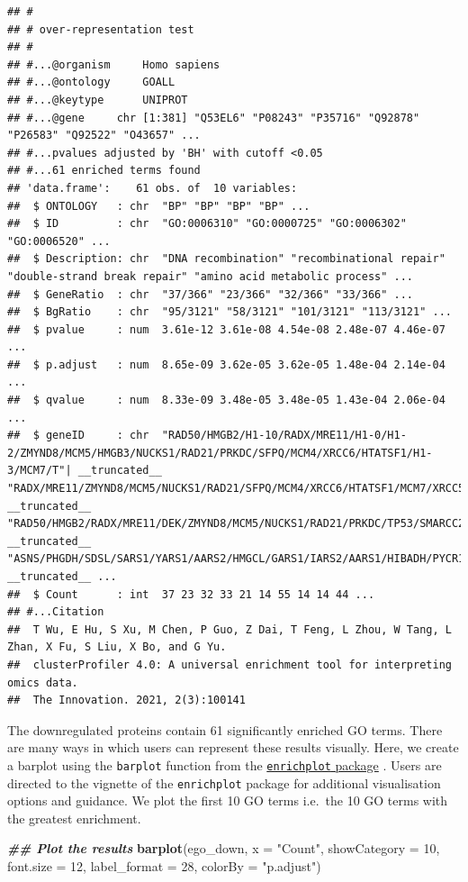 \documentclass[9pt,a4paper,]{extarticle}
\newenvironment{Shaded}{\begin{snugshade}}{\end{snugshade}}
\newcommand{\AttributeTok}[1]{\textcolor[rgb]{0.13,0.29,0.53}{#1}}
\newcommand{\DecValTok}[1]{\textcolor[rgb]{0.00,0.00,0.81}{#1}}
\newcommand{\DocumentationTok}[1]{\textcolor[rgb]{0.56,0.35,0.01}{\textbf{\textit{#1}}}}
\newcommand{\FunctionTok}[1]{\textcolor[rgb]{0.13,0.29,0.53}{\textbf{#1}}}
\newcommand{\NormalTok}[1]{#1}
\newcommand{\StringTok}[1]{\textcolor[rgb]{0.31,0.60,0.02}{#1}}
\begin{document}
\begin{verbatim}
## #
## # over-representation test
## #
## #...@organism     Homo sapiens 
## #...@ontology     GOALL 
## #...@keytype      UNIPROT 
## #...@gene     chr [1:381] "Q53EL6" "P08243" "P35716" "Q92878" "P26583" "Q92522" "O43657" ...
## #...pvalues adjusted by 'BH' with cutoff <0.05 
## #...61 enriched terms found
## 'data.frame':    61 obs. of  10 variables:
##  $ ONTOLOGY   : chr  "BP" "BP" "BP" "BP" ...
##  $ ID         : chr  "GO:0006310" "GO:0000725" "GO:0006302" "GO:0006520" ...
##  $ Description: chr  "DNA recombination" "recombinational repair" "double-strand break repair" "amino acid metabolic process" ...
##  $ GeneRatio  : chr  "37/366" "23/366" "32/366" "33/366" ...
##  $ BgRatio    : chr  "95/3121" "58/3121" "101/3121" "113/3121" ...
##  $ pvalue     : num  3.61e-12 3.61e-08 4.54e-08 2.48e-07 4.46e-07 ...
##  $ p.adjust   : num  8.65e-09 3.62e-05 3.62e-05 1.48e-04 2.14e-04 ...
##  $ qvalue     : num  8.33e-09 3.48e-05 3.48e-05 1.43e-04 2.06e-04 ...
##  $ geneID     : chr  "RAD50/HMGB2/H1-10/RADX/MRE11/H1-0/H1-2/ZMYND8/MCM5/HMGB3/NUCKS1/RAD21/PRKDC/SFPQ/MCM4/XRCC6/HTATSF1/H1-3/MCM7/T"| __truncated__ "RADX/MRE11/ZMYND8/MCM5/NUCKS1/RAD21/SFPQ/MCM4/XRCC6/HTATSF1/MCM7/XRCC5/PPP4R2/POGZ/YY1/MCM3/MCM2/VPS72/PARP1/BR"| __truncated__ "RAD50/HMGB2/RADX/MRE11/DEK/ZMYND8/MCM5/NUCKS1/RAD21/PRKDC/TP53/SMARCC2/SFPQ/MCM4/XRCC6/HPF1/HTATSF1/MCM7/XRCC5/"| __truncated__ "ASNS/PHGDH/SDSL/SARS1/YARS1/AARS2/HMGCL/GARS1/IARS2/AARS1/HIBADH/PYCR1/ACADSB/DHFR/MCCC2/SLC25A12/MARS1/PSAT1/S"| __truncated__ ...
##  $ Count      : int  37 23 32 33 21 14 55 14 14 44 ...
## #...Citation
##  T Wu, E Hu, S Xu, M Chen, P Guo, Z Dai, T Feng, L Zhou, W Tang, L Zhan, X Fu, S Liu, X Bo, and G Yu.
##  clusterProfiler 4.0: A universal enrichment tool for interpreting omics data.
##  The Innovation. 2021, 2(3):100141
\end{verbatim}

The downregulated proteins contain 61 significantly enriched GO
terms. There are many ways in which users can represent these results visually.
Here, we create a barplot using the \texttt{barplot} function from the \href{https://bioconductor.org/packages/release/bioc/html/enrichplot.html}{\texttt{enrichplot} package}
\citep{enrichplot}. Users are directed to the vignette of the \texttt{enrichplot} package
for additional visualisation options and guidance. We plot the first 10 GO terms
i.e.~the 10 GO terms with the greatest enrichment.

\begin{Shaded}
\begin{Highlighting}[]
\DocumentationTok{\#\# Plot the results}
\FunctionTok{barplot}\NormalTok{(ego\_down,}
        \AttributeTok{x =} \StringTok{"Count"}\NormalTok{,}
        \AttributeTok{showCategory =} \DecValTok{10}\NormalTok{,}
        \AttributeTok{font.size =} \DecValTok{12}\NormalTok{,}
        \AttributeTok{label\_format =} \DecValTok{28}\NormalTok{,}
        \AttributeTok{colorBy =} \StringTok{"p.adjust"}\NormalTok{)}
\end{Highlighting}
\end{Shaded}
\end{document}
